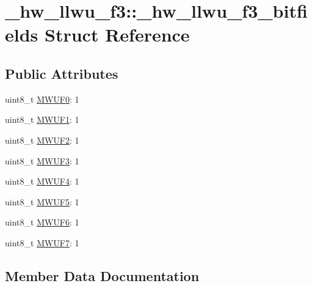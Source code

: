 \hypertarget{struct__hw__llwu__f3_1_1__hw__llwu__f3__bitfields}{}\section{\+\_\+hw\+\_\+llwu\+\_\+f3\+:\+:\+\_\+hw\+\_\+llwu\+\_\+f3\+\_\+bitfields Struct Reference}
\label{struct__hw__llwu__f3_1_1__hw__llwu__f3__bitfields}
\subsection*{Public Attributes}
\begin{DoxyCompactItemize}
\item 
uint8\+\_\+t \hyperlink{struct__hw__llwu__f3_1_1__hw__llwu__f3__bitfields_aa52c97e005b7bcc61d10bb184e0bc37d}{M\+W\+U\+F0}\+: 1
\item 
uint8\+\_\+t \hyperlink{struct__hw__llwu__f3_1_1__hw__llwu__f3__bitfields_a6a17ddc07f82f9699efa006bd0cdec85}{M\+W\+U\+F1}\+: 1
\item 
uint8\+\_\+t \hyperlink{struct__hw__llwu__f3_1_1__hw__llwu__f3__bitfields_a73dc5f5628435a62a037dbb9d345d4ff}{M\+W\+U\+F2}\+: 1
\item 
uint8\+\_\+t \hyperlink{struct__hw__llwu__f3_1_1__hw__llwu__f3__bitfields_ad82e7bab8dbd0f6a4eec962ca998483f}{M\+W\+U\+F3}\+: 1
\item 
uint8\+\_\+t \hyperlink{struct__hw__llwu__f3_1_1__hw__llwu__f3__bitfields_a863bf168501b10548f81944f0a4f4932}{M\+W\+U\+F4}\+: 1
\item 
uint8\+\_\+t \hyperlink{struct__hw__llwu__f3_1_1__hw__llwu__f3__bitfields_ac56a8be6685f93025e110c2214ae08b6}{M\+W\+U\+F5}\+: 1
\item 
uint8\+\_\+t \hyperlink{struct__hw__llwu__f3_1_1__hw__llwu__f3__bitfields_a1abbbb977b3512a66be8b32b509c3527}{M\+W\+U\+F6}\+: 1
\item 
uint8\+\_\+t \hyperlink{struct__hw__llwu__f3_1_1__hw__llwu__f3__bitfields_a989738f1aa84a4eb097d728b89471f34}{M\+W\+U\+F7}\+: 1
\end{DoxyCompactItemize}


\subsection{Member Data Documentation}
